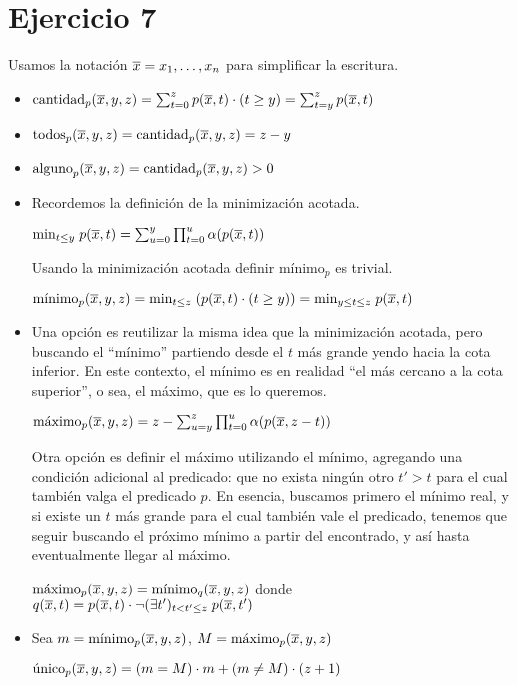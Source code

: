 \section*{Ejercicio 7}

Usamos la notación $\overline{x} = x_1, \dots, x_n$ para simplificar la escritura.

\begin{itemize}
    \item $\text{cantidad}_p(\overline{x}, y, z) = \sum_{t=0}^z p(\overline{x}, t) \cdot (t \geq y) = \sum_{t=y}^z p(\overline{x}, t)$

    \item $\text{todos}_p(\overline{x}, y, z) = \text{cantidad}_p(\overline{x}, y, z) = z - y$

    \item $\text{alguno}_p(\overline{x}, y, z) = \text{cantidad}_p(\overline{x}, y, z) > 0$

    \item Recordemos la definición de la minimización acotada.

    $\text{min}_{t \leq y} \; p(\overline{x}, t) = \sum_{u=0}^y \prod_{t=0}^u \alpha(p(\overline{x}, t))$

    Usando la minimización acotada definir $\text{mínimo}_p$ es trivial.

    $\text{mínimo}_p(\overline{x}, y, z) = \text{min}_{t \leq z} \; (p(\overline{x}, t) \cdot (t \geq y)) = \text{min}_{y \leq t \leq z} \; p(\overline{x}, t)$

    \item Una opción es reutilizar la misma idea que la minimización acotada, pero buscando el ``mínimo'' partiendo desde el $t$ más grande yendo hacia la cota inferior. En este contexto, el mínimo es en realidad ``el más cercano a la cota superior'', o sea, el máximo, que es lo queremos.

    $\text{máximo}_p(\overline{x}, y, z) = z - \sum_{u=y}^z \prod_{t=0}^u \alpha(p(\overline{x}, z - t))$

    Otra opción es definir el máximo utilizando el mínimo, agregando una condición adicional al predicado: que no exista ningún otro $t' > t$ para el cual también valga el predicado $p$. En esencia, buscamos primero el mínimo real, y si existe un $t$ más grande para el cual también vale el predicado, tenemos que seguir buscando el próximo mínimo a partir del encontrado, y así hasta eventualmente llegar al máximo.

    $\text{máximo}_p(\overline{x}, y, z) = \text{mínimo}_q(\overline{x}, y, z)$ donde $q(\overline{x}, t) = p(\overline{x}, t) \cdot \neg (\exists t')_{t < t' \leq z} \; p(\overline{x}, t')$

    \item Sea $m = \text{mínimo}_p(\overline{x}, y, z)$, $M = \text{máximo}_p(\overline{x}, y, z)$

    $\text{único}_p(\overline{x}, y, z) = (m = M) \cdot m + (m \neq M) \cdot (z + 1)$
\end{itemize}
